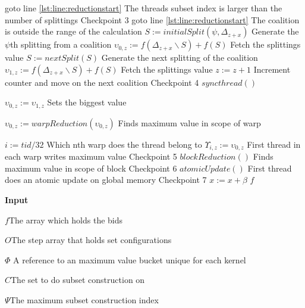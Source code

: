 \documentclass[a4paper, 12pt]{report}
\begin{document}
\begin{algorithm*}[!t]
\begin{algorithmic}[1]
  \IF{$\psi \geq \Psi$}
    \STATE goto line \ref{lst:line:reductionstart} \hfill The threads subset index is larger than the number of splittings
  \ENDIF
\hfill Checkpoint 3
    \label{lst:line:gotoif}
      \STATE goto line \ref{lst:line:reductionstart} \hfill The coalition is outside the range of the calculation
    \ENDIF
    \STATE $S := initialSplit(\psi,\Delta_{z+x})$ \hfill Generate the $\psi$th splitting from a coalition 
    \STATE $\upsilon_{0,z} := f(\Delta_{z+x}\backslash S)+f(S)$ \hfill Fetch the splittings value
    \STATE $S := nextSplit(S)$ \hfill Generate the next splitting of the coalition
    \STATE $\upsilon_{1,z} := f(\Delta_{z+x}\backslash S)+f(S)$ \hfill Fetch the splittings value
    \STATE $z := z + 1$ \hfill Increment counter and move on the next coalition
  \ENDFOR
\hfill Checkpoint 4
\STATE $syncthread()$
  \label{lst:line:reductionstart}
  
    \label{lst:line:checkif}
      \STATE $\upsilon_{0,z} := \upsilon_{1,z}$ \hfill Sets the biggest value
    \ENDIF
    
    \STATE $\upsilon_{0,z} := warpReduction(\upsilon_{0,z})$ \hfill Finds maximum value in scope of warp

      \STATE $i := tid / 32$ \hfill Which nth warp does the thread belong to
      \STATE $\Upsilon_{i,z} := \upsilon_{0,z}$ \hfill First thread in each warp writes maximum value
    \ENDIF
  \ENDFOR   \hfill Checkpoint 5
  \STATE $blockReduction()$\label{lst:line:blockReduction} \hfill Finds maximum value in scope of block
  \hfill Checkpoint 6
  \STATE $atomicUpdate()$\label{lst:line:reductionend} \hfill First thread does an atomic update on global memory
  \ENDIF  \hfill Checkpoint 7
  \STATE $x := x + \beta$
\ENDFOR
\RETURN $f$
\end{algorithmic}
\end{algorithm*}



\textbf{Input}

$f$\hfill The array which holds the bids

$O$\hfill The step array that holds set configurations

$ \Phi $ \hfill A reference to an maximum value bucket unique for each kernel

$C$\hfill The set to do subset construction on

$\Psi$\hfill The maximum subset construction index
\end{document}
